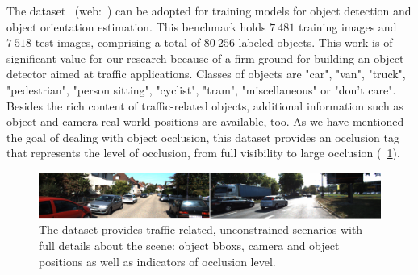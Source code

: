 The  dataset~\cite{geiger2012cvpr} (web:~\cite{webkittiobjdetectiondataset}) can be adopted for training models for object detection and object orientation estimation. This benchmark holds $7\ 481$ training images and $7\ 518$ test images, comprising a total of $80\ 256$ labeled objects. This work is of significant value for our research because of a firm ground for building an object detector aimed at traffic applications. Classes of objects are "car", "van", "truck", "pedestrian", "person sitting", "cyclist", "tram", "miscellaneous" or "don't care". Besides the rich content of traffic-related objects, additional information such as object and camera real-world positions are available, too. As we have mentioned the goal of dealing with object occlusion, this dataset provides an occlusion tag that represents the level of occlusion, from full visibility to large occlusion (\figtext{}~\ref{fig:KITTIDetectionDataset}).

\begin{figure}[t]
    \centerline{\includegraphics[width=0.9\linewidth]{figures/datasets/kitti_detection_sample.pdf}}
    \caption[ dataset]{The  dataset provides traffic-related, unconstrained scenarios with full details about the scene: object \glspl{bbox}, camera and object positions as well as indicators of occlusion level. }
    \label{fig:KITTIDetectionDataset}
\end{figure}
